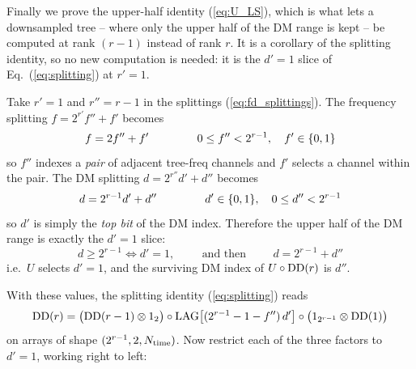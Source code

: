 \documentclass{article}
\numberwithin{equation}{section}   %
\def\DD{{\rm DD}}
\def\LAG{{\rm LAG}}
\begin{document}
Finally we prove the upper-half identity (\ref{eq:U_LS}), which is what lets a downsampled
tree -- where only the upper half of the DM range is kept -- be computed at rank $(r-1)$
instead of rank $r$. It is a corollary of the splitting identity, so no new computation is
needed: it is the $d'=1$ slice of Eq.\ (\ref{eq:splitting}) at $r'=1$.

Take $r' = 1$ and $r'' = r-1$ in the splittings (\ref{eq:fd_splittings}). The frequency
splitting $f = 2^{r'} f'' + f'$ becomes
\begin{equation}
f = 2 f'' + f'
  \hspace{1.5cm} 0 \le f'' < 2^{r-1}, \quad f' \in \{0,1\}
\end{equation}
so $f''$ indexes a {\em pair} of adjacent tree-freq channels and $f'$ selects a channel within
the pair. The DM splitting $d = 2^{r''} d' + d''$ becomes
\begin{equation}
d = 2^{r-1} d' + d''
  \hspace{1.5cm} d' \in \{0,1\}, \quad 0 \le d'' < 2^{r-1}
\end{equation}
so $d'$ is simply the {\em top bit} of the DM index. Therefore the upper half of the DM range
is exactly the $d'=1$ slice:
\begin{equation}
d \ge 2^{r-1} \iff d' = 1,
  \hspace{1cm}\mbox{and then}\hspace{1cm} d = 2^{r-1} + d''
\end{equation}
i.e.\ $U$ selects $d'=1$, and the surviving DM index of $U \circ \DD(r)$ is $d''$.

With these values, the splitting identity (\ref{eq:splitting}) reads
\begin{equation}
\DD(r) = \big( \DD(r-1) \otimes 1_2 \big)
   \circ \LAG\big[ (2^{r-1}-1-f'') \, d' \big]
   \circ \big( 1_{2^{r-1}} \otimes \DD(1) \big)
\label{eq:uh_splitting}
\end{equation}
on arrays of shape $(2^{r-1}, 2, N_{\rm time})$. Now restrict each of the three factors to
$d'=1$, working right to left:
\end{document}
